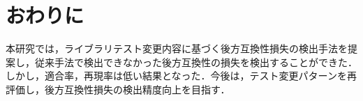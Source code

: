 \documentclass[T,J]{fose} %
\begin{document}
\section{おわりに}
本研究では，ライブラリテスト変更内容に基づく後方互換性損失の検出手法を提案し，従来手法で検出できなかった後方互換性の損失を検出することができた．しかし，適合率，再現率は低い結果となった．今後は，テスト変更パターンを再評価し，後方互換性損失の検出精度向上を目指す．





\end{document}
